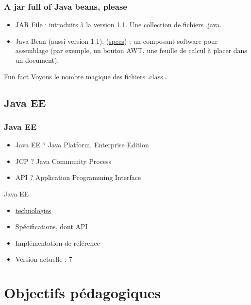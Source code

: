 \documentclass[english, french]{beamer}
\begin{document}
\begin{frame}
	\frametitle{A jar full of Java beans, please}
	\begin{itemize}
		\item JAR File : introduits à la version 1.1. Une collection de fichiers .java.
		\item Java Bean (aussi version 1.1). (\href{http://www.oracle.com/technetwork/java/javase/documentation/spec-136004.html}{specs}) : un composant software pour assemblage (par exemple, un bouton AWT, une feuille de calcul à placer dans un document).
	\end{itemize}
	\begin{block}{Fun fact}
		Voyons le nombre magique des fichiers .class…
	\end{block}
\end{frame}

\subsection{Java EE}
\begin{frame}
	\frametitle{Java EE}
	\begin{itemize}
		\item Java EE ? \pause Java Platform, Enterprise Edition \pause
		\item JCP ? \pause Java Community Process \pause
		\item API ? \pause Application Programming Interface \pause
	\end{itemize}
	\begin{block}{Java EE}
		\begin{itemize}
			\item \href{http://www.oracle.com/technetwork/java/javaee/tech/index.html}{technologies}
			\item Spécifications, dont API
			\item Implémentation de référence
			\item Version actuelle : 7
		\end{itemize}
	\end{block}
\end{frame}

\section{Objectifs pédagogiques}
\end{document}
